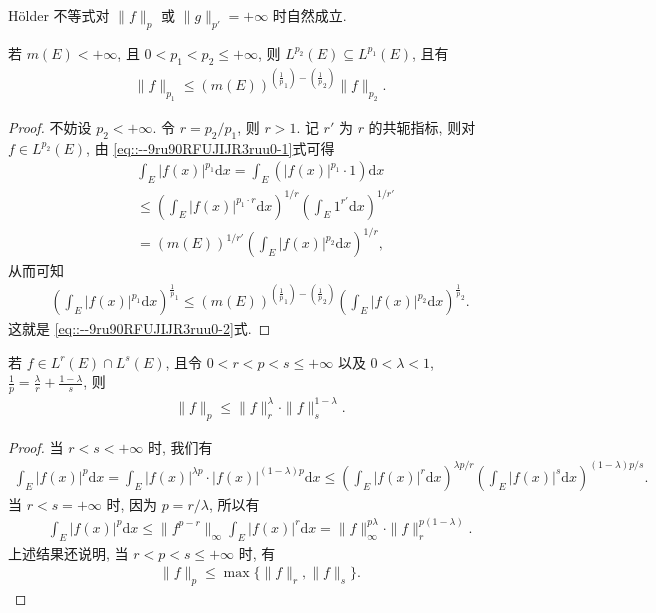 \documentclass[../../main.tex]{subfiles}%
\begin{document}
\begin{remark}
Hölder 不等式对 $\|f\|_p$ 或 $\|g\|_{p'}=+\infty$ 时自然成立.
\end{remark}

\begin{example}
若 $m(E)<+\infty$, 且 $0<p_1<p_2\leqslant+\infty$, 则 $L^{p_2}(E)\subseteq L^{p_1}(E)$, 且有
\begin{align}
\|f\|_{p_1} \leqslant (m(E))^{(\frac{1}{p}_1)-(\frac{1}{p}_2)} \|f\|_{p_2}.
\end{align}
\end{example}

\begin{proof}

不妨设 $p_2<+\infty$. 令 $r=p_2/p_1$, 则 $r>1$. 记 $r'$ 为 $r$ 的共轭指标, 则对 $f\in L^{p_2}(E)$, 由 \eqref{eq::--9ru90RFUJIJR3ruu0-1}式可得
\begin{align*}
&\int_E |f(x)|^{p_1} \mathrm{d}x = \int_E (|f(x)|^{p_1} \cdot 1) \mathrm{d}x \\
&\leqslant \left( \int_E |f(x)|^{p_1 \cdot r} \mathrm{d}x \right)^{1/r} \left( \int_E 1^{r'} \mathrm{d}x \right)^{1/r'} \\
&= (m(E))^{1/r'} \left( \int_E |f(x)|^{p_2} \mathrm{d}x \right)^{1/r},
\end{align*}
从而可知
\begin{align*}
\left( \int_E |f(x)|^{p_1} \mathrm{d}x \right)^{\frac{1}{p}_1} \leqslant (m(E))^{(\frac{1}{p}_1)-(\frac{1}{p}_2)} \left( \int_E |f(x)|^{p_2} \mathrm{d}x \right)^{\frac{1}{p}_2}.
\end{align*}
这就是 \eqref{eq::--9ru90RFUJIJR3ruu0-2}式.

\end{proof}

\begin{example}
若 $f\in L^r(E)\cap L^s(E)$, 且令 $0<r<p<s\leqslant+\infty$ 以及 $0<\lambda<1$, $\frac{1}{p}=\frac{\lambda}{r}+\frac{1-\lambda}{s}$, 则
\begin{align*}
\|f\|_p \leqslant \|f\|_r^\lambda \cdot \|f\|_s^{1-\lambda}.
\end{align*}
\end{example}

\begin{proof}

当 $r<s<+\infty$ 时, 我们有
\begin{align*}
\int_E |f(x)|^p \mathrm{d}x = \int_E |f(x)|^{\lambda p} \cdot |f(x)|^{(1-\lambda)p} \mathrm{d}x 
\leqslant \left( \int_E |f(x)|^r \mathrm{d}x \right)^{\lambda p/r} \left( \int_E |f(x)|^s \mathrm{d}x \right)^{(1-\lambda)p/s}.
\end{align*}
当 $r<s=+\infty$ 时, 因为 $p=r/\lambda$, 所以有
\begin{align*}
\int_E |f(x)|^p \mathrm{d}x \leqslant \|f^{p-r}\|_\infty \int_E |f(x)|^r \mathrm{d}x = \|f\|_\infty^{p\lambda} \cdot \|f\|_r^{p(1-\lambda)}.
\end{align*}
上述结果还说明, 当 $r<p<s\leqslant+\infty$ 时, 有
\begin{align*}
\|f\|_p \leqslant \max\{ \|f\|_r, \|f\|_s \}.
\end{align*}

\end{proof}
\end{document}
